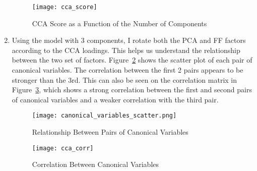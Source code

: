 \begin{solution}
\begin{enumerate}[label = \Alph*)]
        \begin{figure}[!htbp]
            \begin{small}
                \begin{center}
                    \texttt{[image: cca\_score]}
                \end{center}
                \caption{CCA Score as a Function of the Number of Components}
                \label{fig:cca_score}
            \end{small}
        \end{figure}
        
        \item Using the model with 3 components, I rotate both the PCA and FF factors according to the CCA loadings. This helps us understand the relationship between the two set of factors. Figure~\ref{fig:canonical_variables_scatter} shows the scatter plot of each pair of canonical variables. The correlation between the first 2 pairs appears to be stronger than the 3rd. This can also be seen on the correlation matrix in Figure~\ref{fig:cca_corr}, which shows a strong correlation between the first and second pairs of canonical variables and a weaker correlation with the third pair.
        
        \begin{figure}[!htbp]
            \begin{small}
                \begin{center}
                    \texttt{[image: canonical\_variables\_scatter.png]}
                \end{center}
                \caption{Relationship Between Pairs of Canonical Variables}
                \label{fig:canonical_variables_scatter}
            \end{small}
        \end{figure}
        
        \begin{figure}
            \begin{small}
                \begin{center}
                    \texttt{[image: cca\_corr]}
                \end{center}
                \caption{Correlation Between Canonical Variables}
                \label{fig:cca_corr}
            \end{small}
        \end{figure}
        
    \end{enumerate}
\end{solution}